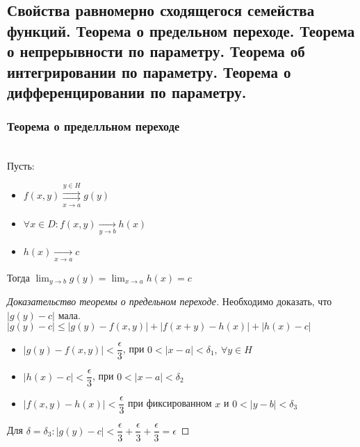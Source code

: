 \subsection{Свойства равномерно сходящегося семейства функций. Теорема о предельном переходе. Теорема о непрерывности по параметру. Теорема об интегрировании по параметру. Теорема о дифференцировании по параметру.}

\subsubsection{Теорема о пределльном переходе}

\begin{theorem*} \ \\
    Пусть: 
    \begin{itemize}
        \item $f(x, y) \overset{y \in H}{\underset{x \to a}{\rightrightarrows}} g(y)$
        \item $\forall x \in D: f(x, y) \underset{y \to b}{\to} h(x)$
        \item $h(x) \underset{x \to a}{\to} c$
    \end{itemize}  
    Тогда $\displaystyle \lim_{y \to b} g(y) = \lim_{x \to a} h(x) = c$
\end{theorem*}
\begin{proof}[Доказательство теоремы о предельном переходе]
    Необходимо доказать, что $|g(y) - c|$ мала. \\
    $|g(y) - c| \leqslant |g(y) - f(x, y)| + |f(x + y) - h(x)| + |h(x) - c|$ \\
    \begin{itemize}
        \item $|g(y) - f(x, y)| < \dfrac{\epsilon}{3}$, при $ 0 < |x - a| < \delta_1, \ \forall y \in H$
        \item $|h(x) - c| < \dfrac{\epsilon}{3}$, при $0 < |x - a| < \delta_2$
        \item $|f(x, y) - h(x)| < \dfrac{\epsilon}{3}$ при фиксированном
         $x$ и  $0 < |y - b| < \delta_3$
    \end{itemize}  
    Для $\delta = \delta_3: |g(y) - c| < \dfrac{\epsilon}{3} + 
    \dfrac{\epsilon}{3} +  \dfrac{\epsilon}{3} = \epsilon$
\end{proof}
